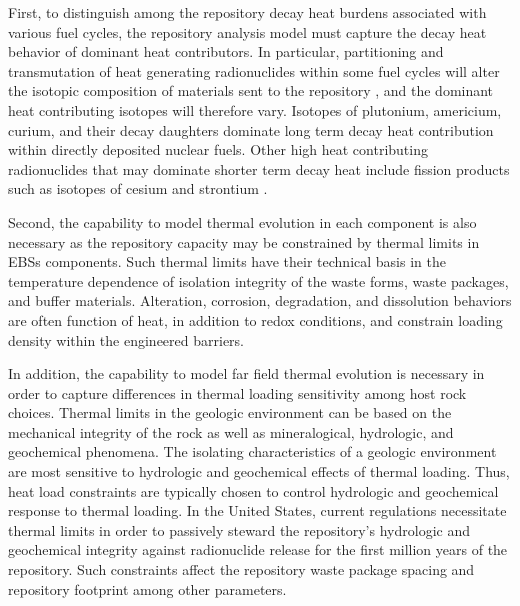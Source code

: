 First, to distinguish among the repository decay heat burdens associated with 
various fuel cycles, the repository analysis model must
capture the decay heat behavior of dominant heat contributors. In particular, 
partitioning and transmutation of heat generating radionuclides within  some 
fuel cycles will alter the isotopic composition of materials sent to the 
repository \cite{swift_applying_2010}, and the dominant heat contributing 
isotopes will therefore vary.  Isotopes of plutonium, americium, curium, and their 
decay daughters dominate long term decay heat contribution within directly 
deposited nuclear fuels. Other high heat contributing radionuclides that may 
dominate shorter term decay heat include fission products such as isotopes of 
cesium and strontium \cite{piet_which_2007}. 

Second, the capability to model thermal evolution in each component is also 
necessary as the repository capacity may be constrained by thermal limits in 
\glspl{EBS} components. Such thermal limits have their technical basis in the 
temperature dependence of isolation integrity of the waste forms, waste 
packages, and buffer materials. Alteration, corrosion, degradation, and 
dissolution behaviors are often function of heat, in addition to redox 
conditions, and constrain loading density within the engineered barriers. 

In addition, the capability to model far field thermal evolution is necessary 
in order to capture differences in thermal loading sensitivity among host rock 
choices. Thermal limits in the geologic environment can be based on the 
mechanical integrity of the rock as well as mineralogical, hydrologic, and 
geochemical phenomena. The isolating characteristics of a geologic 
environment are most sensitive to hydrologic and geochemical effects of thermal 
loading. Thus, heat load constraints are typically chosen to control hydrologic 
and geochemical response to thermal loading. In the United States, current 
regulations necessitate thermal limits in order to passively steward the 
repository's hydrologic and geochemical integrity against radionuclide  release 
for the first million years of the repository.  Such constraints affect the 
repository waste package spacing and repository footprint among other 
parameters. 

